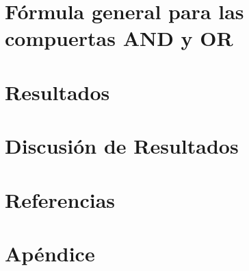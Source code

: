 \documentclass{article}
\begin{document}
\section{Fórmula general para las compuertas AND y OR}
\section{Resultados}
\section{Discusión de Resultados}
\section{Referencias}
\section{Apéndice}
\end{document}
